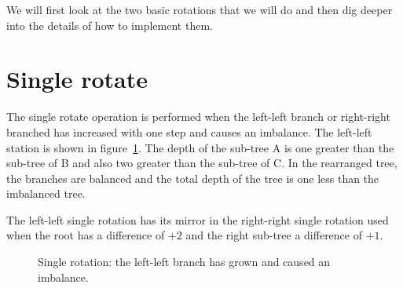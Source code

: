 \documentclass[a4paper,11pt]{article}
\begin{document}
We will first look at the two basic rotations that we will do and then
dig deeper into the details of how to implement them.



\section{Single rotate}

The single rotate operation is performed when the left-left branch or
right-right branched has increased with one step and causes an
imbalance. The left-left station is shown in
figure~\ref{fig:single}. The depth of the sub-tree A is one greater
than the sub-tree of B and also two greater than the sub-tree of C. In
the rearranged tree, the branches are balanced and the total depth of
the tree is one less than the imbalanced tree.

The left-left single rotation has its mirror in the right-right
single rotation used when the root has a difference of $+2$ and the
right sub-tree a difference of $+1$.

\begin{figure}[h!]


\caption{Single rotation: the left-left branch has grown and caused an imbalance. \label{fig:single}}
\end{figure}
\end{document}
